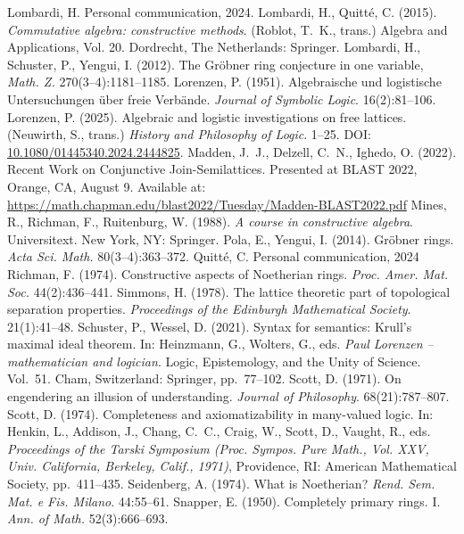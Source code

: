 \documentclass[11pt]{article}
\theoremstyle{definition}
\begin{document}
\begin{thebibliography}{99}
 Lombardi, H. Personal communication, 2024.
 Lombardi, H., Quitté, C. (2015). \emph{Commutative algebra: constructive methods}. (Roblot, T.~K., trans.) Algebra and Applications, Vol. 20. Dordrecht, The Netherlands: Springer.
 Lombardi, H., Schuster, P., Yengui, I. (2012). The Gröbner ring conjecture in one variable, \emph{Math. Z.} 270(3--4):1181--1185.
 Lorenzen, P. (1951). Algebraische und logistische Untersuchungen über freie Verbände. \emph{Journal of Symbolic Logic}. 16(2):81--106.
 Lorenzen, P. (2025). Algebraic and logistic investigations on free lattices. (Neuwirth, S., trans.) \emph{History and Philosophy of Logic}. 1--25. DOI: \href{https://doi.org/10.1080/01445340.2024.2444825}{10.1080/01445340.2024.2444825}.
 Madden, J.~J., Delzell, C.~N., Ighedo, O. (2022). Recent Work on Conjunctive Join-Semilattices. Presented at BLAST 2022, Orange, CA, August 9. Available at: \url{https://math.chapman.edu/blast2022/Tuesday/Madden-BLAST2022.pdf}
 Mines, R., Richman, F., Ruitenburg, W. (1988). \emph{A course in constructive algebra}. Universitext. New York, NY: Springer.
 Pola, E., Yengui, I. (2014). Gröbner rings. \emph{Acta Sci. Math.} 80(3--4):363--372.
 Quitté, C. Personal communication, 2024
 Richman, F. (1974). Constructive aspects of Noetherian rings. \emph{Proc. Amer. Mat. Soc.} 44(2):436--441.
 Simmons, H. (1978). The lattice theoretic part of topological separation properties. \emph{Proceedings of the Edinburgh Mathematical Society}. 21(1):41--48.
 Schuster, P., Wessel, D. (2021). Syntax for semantics: Krull's maximal ideal theorem. In: Heinzmann, G., Wolters, G., eds. \emph{Paul Lorenzen -- mathematician and logician}. Logic, Epistemology, and the Unity of Science. Vol.~51. Cham, Switzerland: Springer, pp.~77--102.
 Scott, D. (1971). On engendering an illusion of understanding. \emph{Journal of Philosophy}. 68(21):787--807.
 Scott, D. (1974). Completeness and axiomatizability in many-valued logic. In: Henkin, L., Addison, J., Chang, C.~C., Craig, W., Scott, D., Vaught, R., eds. \emph{Proceedings of the Tarski Symposium (Proc. Sympos. Pure Math., Vol. XXV, Univ. California, Berkeley, Calif., 1971)}, Providence, RI: American Mathematical Society, pp.~411--435.
 Seidenberg, A. (1974). What is Noetherian? \emph{Rend. Sem. Mat. e Fis. Milano}. 44:55--61.
 Snapper, E. (1950). Completely primary rings. I. \emph{Ann. of Math.} 52(3):666--693.

\end{thebibliography}
\end{document}
